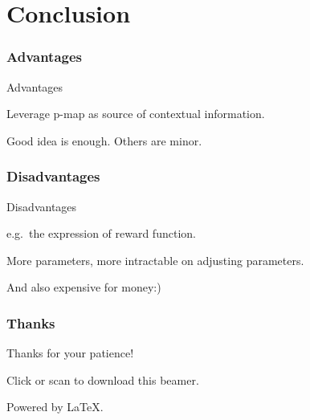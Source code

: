 \documentclass[12pt, aspectratio = 169, xcolor = x11names]{beamer}
\begin{document}
\section{Conclusion}%
\label{sec:conclusion}

\begin{frame}
  \frametitle{Advantages}
  \begin{block}{Advantages}
    \pause%
    \begin{description}[<+->]
      \item[Innovation]Leverage p-map as source of contextual information.
      \item<+-|alert@+>[None]Good idea is enough. Others are minor.
    \end{description}
  \end{block}
\end{frame}

\begin{frame}
  \frametitle{Disadvantages}
  \begin{block}{Disadvantages}
    \pause%
    \begin{description}[<+->]
      \item[Subjectivity]e.g.\ the expression of reward function.
      \item[Difficulty]More parameters, more intractable on adjusting parameters.
      \item[Computationally expensive]And also expensive for money:)
    \end{description}
  \end{block}
\end{frame}

\begin{frame}
  \frametitle{Thanks}
  \begin{center}
    {\Large Thanks for your patience!}

    Click \href{https://github.com/Freed-Wu/ciss-beamer}{\faGithub} or scan
     to download this beamer.
  \end{center}

  \begin{flushright}
    Powered by \LaTeX.
  \end{flushright}
\end{frame}
\end{document}
